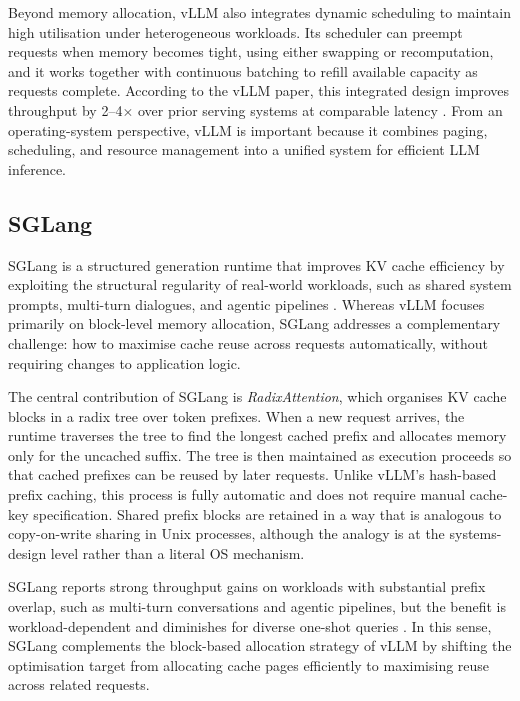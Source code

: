 \documentclass[10pt, a4paper]{article}
\begin{document}
Beyond memory allocation, vLLM also integrates dynamic scheduling to maintain high utilisation under heterogeneous workloads. Its scheduler can preempt requests when memory becomes tight, using either swapping or recomputation, and it works together with continuous batching to refill available capacity as requests complete. According to the vLLM paper, this integrated design improves throughput by 2--4$\times$ over prior serving systems at comparable latency \cite{kwon2023vllm}. From an operating-system perspective, vLLM is important because it combines paging, scheduling, and resource management into a unified system for efficient LLM inference.


\subsection{SGLang}


SGLang is a structured generation runtime that improves KV cache
efficiency by exploiting the structural regularity of real-world
workloads, such as shared system prompts, multi-turn dialogues,
and agentic pipelines \cite{zheng2024sglang}. Whereas vLLM focuses
primarily on block-level memory allocation, SGLang addresses a
complementary challenge: how to maximise cache reuse across requests
automatically, without requiring changes to application logic.

The central contribution of SGLang is \emph{RadixAttention}, which
organises KV cache blocks in a radix tree over token prefixes.
When a new request arrives, the runtime traverses the tree to find
the longest cached prefix and allocates memory only for the uncached
suffix. The tree is then maintained as execution proceeds so that
cached prefixes can be reused by later requests. Unlike vLLM's
hash-based prefix caching, this process is fully automatic and does
not require manual cache-key specification. Shared prefix blocks are
retained in a way that is analogous to copy-on-write sharing in Unix
processes, although the analogy is at the systems-design level rather
than a literal OS mechanism.

SGLang reports strong throughput gains on workloads with substantial
prefix overlap, such as multi-turn conversations and agentic
pipelines, but the benefit is workload-dependent and diminishes for
diverse one-shot queries \cite{zheng2024sglang}. In this sense,
SGLang complements the block-based allocation strategy of vLLM by
shifting the optimisation target from allocating cache pages
efficiently to maximising reuse across related requests.
\end{document}
